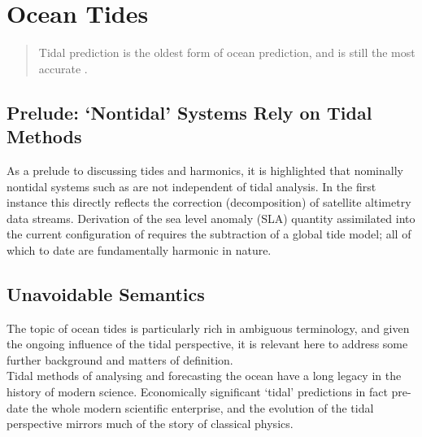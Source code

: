 \section{Ocean Tides}
\label{S:TIDE}

\begin{quote}
Tidal prediction is the oldest form of ocean prediction, and is still the most accurate \citep{Parker:2007wq}. 
\end{quote}

\subsection{Prelude: `Nontidal' Systems Rely on Tidal Methods}
As a prelude to discussing tides and harmonics, it is highlighted that nominally nontidal systems such as \BL{} are not independent of tidal analysis. In the first instance this directly reflects the correction (decomposition) of satellite altimetry data streams.   Derivation of the sea level anomaly (SLA) quantity assimilated into the current configuration of \BL{} requires the subtraction of a global tide model; all of which to date are fundamentally harmonic in nature. 


\subsection{Unavoidable Semantics}
\label{SS:semantics}
The topic of ocean tides is particularly rich in ambiguous terminology, and given the ongoing influence of the tidal perspective, it is relevant here to address some further background and matters of definition.\\ 
Tidal methods of analysing and forecasting the ocean have a long legacy in the history of modern science.  Economically significant `tidal' predictions in fact pre-date the whole modern scientific enterprise, and the evolution of the tidal perspective mirrors much of the story of classical physics.\\

